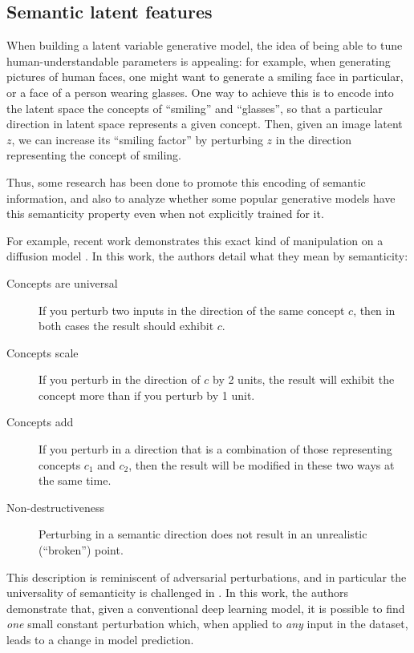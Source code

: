 \documentclass[../main.tex]{subfiles}
\begin{document}
\subsection{Semantic latent features}

When building a latent variable generative model, the idea of being able to tune human-understandable parameters is appealing: for example, when generating pictures of human faces, one might want to generate a smiling face in particular, or a face of a person wearing glasses.
One way to achieve this is to encode into the latent space the concepts of ``smiling'' and ``glasses'', so that a particular direction in latent space represents a given concept.
Then, given an image latent $z$, we can increase its ``smiling factor'' by perturbing $z$ in the direction representing the concept of smiling.

Thus, some research has been done to promote this encoding of semantic information, and also to analyze whether some popular generative models have this semanticity property even when not explicitly trained for it.

For example, recent work demonstrates this exact kind of manipulation on a diffusion model \cite{kwonDiffusion2023}.
In this work, the authors detail what they mean by semanticity:
\begin{description}
	\item[Concepts are universal] If you perturb two inputs in the direction of the same concept $c$, then in both cases the result should exhibit $c$.
\item[Concepts scale] If you perturb in the direction of $c$ by 2 units, the result will exhibit the concept more than if you perturb by 1 unit.
\item[Concepts add] If you perturb in a direction that is a combination of those representing concepts $c_1$ and $c_2$, then the result will be modified in these two ways at the same time.
	\item[Non-destructiveness] Perturbing in a semantic direction does not result in an unrealistic (``broken'') point.
\end{description}

This description is reminiscent of adversarial perturbations, and in particular the universality of semanticity is challenged in \cite{moosavi-dezfooliUniversal2017}.
In this work, the authors demonstrate that, given a conventional deep learning model, it is possible to find \emph{one} small constant perturbation which, when applied to \emph{any} input in the dataset, leads to a change in model prediction.
\end{document}
